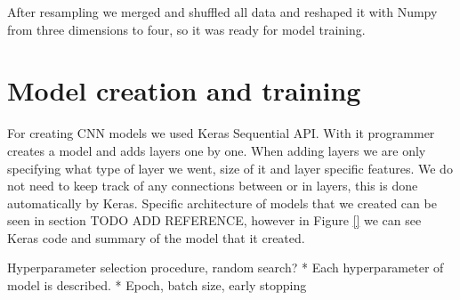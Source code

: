 After resampling we merged and shuffled all data and reshaped it with Numpy from three dimensions to four, so it was ready for model training.


\section{ Model creation and training}\label{cnn_ref}

For creating CNN models we used Keras Sequential API. 
With it programmer creates a model and adds layers one by one.
When adding layers we are only specifying what type of layer we went, size of it and layer specific features. 
We do not need to keep track of any connections between or in layers, this is done automatically by Keras.
Specific architecture of models that we created can be seen in section TODO ADD REFERENCE, however in Figure \ref{} we can see Keras code and summary of the model that it created.



Hyperparameter selection procedure, random search?
* Each hyperparameter of model is described.
* Epoch, batch size, early stopping



\lstset{style=mystyle}

